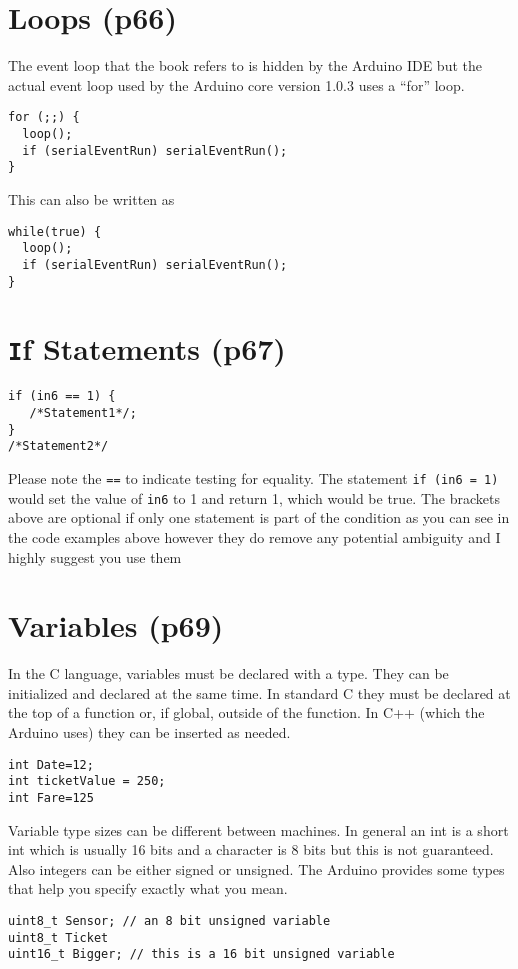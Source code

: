 \documentclass{book}
\begin{document}
\section{Loops (p66)}
The event loop that the book refers to is hidden by the Arduino IDE but the actual event loop used by the Arduino core version 1.0.3 uses a ``for'' loop.
\begin{verbatim}
for (;;) {
  loop();
  if (serialEventRun) serialEventRun();
}
\end{verbatim}
This can also be written as
\begin{verbatim}
while(true) {
  loop();
  if (serialEventRun) serialEventRun();
}
\end{verbatim}

\section{{\texttt If} Statements (p67)}
\begin{verbatim}
if (in6 == 1) {
   /*Statement1*/;
}
/*Statement2*/
\end{verbatim}

Please note the \verb|==| to indicate testing for equality. The statement
\verb|if (in6 = 1)|
would set the value of \verb|in6| to 1 and return 1, which would be true.
The brackets above are optional if only one statement is part of the condition as you can see in the code examples above however they do remove any potential ambiguity and I highly suggest you use them

\section{Variables (p69)}
In the C language, variables must be declared with a type. They can be initialized and declared at the same time. In standard C they must be declared at the top of a function or, if global, outside of the function. In C++ (which the Arduino uses) they can be inserted as needed.
\begin{verbatim}
int Date=12;
int ticketValue = 250;
int Fare=125
\end{verbatim}

Variable type sizes can be different between machines. In general an int is a short int which is usually 16 bits and a character is 8 bits but this is not guaranteed. Also integers can be either signed or unsigned. The Arduino provides some types that help you specify exactly what you mean.

\begin{verbatim}
uint8_t Sensor; // an 8 bit unsigned variable
uint8_t Ticket
uint16_t Bigger; // this is a 16 bit unsigned variable
\end{verbatim}
\end{document}
